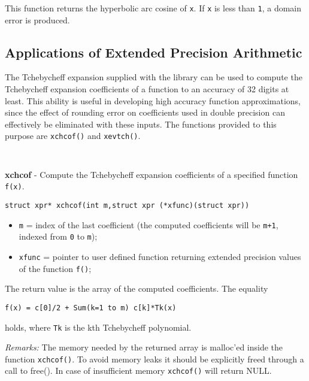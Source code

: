 \documentclass{article}
\begin{document}
This function  returns the hyperbolic arc cosine of \texttt{x}.
If \texttt{x} is less than \texttt{1}, a domain error is produced.

\hypertarget{toc11}{}
\subsection{Applications of Extended Precision Arithmetic}
The Tchebycheff expansion supplied with the library can be used to
compute the Tchebycheff expansion coefficients of a function to an accuracy
of 32 digits at least. This ability is useful in developing high accuracy function
approximations, since the effect of rounding error on coefficients used in
double precision can effectively be eliminated with these inputs.
The functions provided to this purpose are \texttt{xchcof()} and
\texttt{xevtch()}.

\begin{verbatim}
   
\end{verbatim}

\textbf{xchcof} - Compute the Tchebycheff expansion coefficients of a 
specified function \texttt{f(x)}.

\begin{verbatim}
struct xpr* xchcof(int m,struct xpr (*xfunc)(struct xpr))
\end{verbatim}

\begin{itemize}
\item \texttt{m} = index of the last coefficient (the computed coefficients will
be \texttt{m+1}, indexed from \texttt{0} to \texttt{m});
\item \texttt{xfunc} = pointer to user defined function returning extended
precision values of the function \texttt{f()};
\end{itemize}

The return value is the array of the computed coefficients.
The equality

\begin{verbatim}
f(x) = c[0]/2 + Sum(k=1 to m) c[k]*Tk(x) 
\end{verbatim}
holds, where \texttt{Tk} is the kth  Tchebycheff polynomial.

\textit{Remarks:} 
The memory needed by the returned array is malloc'ed
inside the function \texttt{xchcof()}. 
To avoid memory leaks it should be explicitly freed through a call to free().
In case of insufficient memory \texttt{xchcof()} will return NULL.
\end{document}
